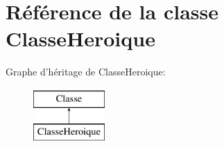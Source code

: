 \hypertarget{classClasseHeroique}{\section{Référence de la classe Classe\-Heroique}
\label{classClasseHeroique}
}
Graphe d'héritage de Classe\-Heroique\-:\begin{figure}[H]
\begin{center}
\leavevmode
\includegraphics[height=2.000000cm]{classClasseHeroique}
\end{center}
\end{figure}

